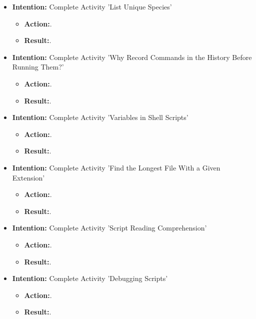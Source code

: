 \documentclass{article}
\begin{document}
\begin{itemize}

\item{\textbf{Intention:} Complete Activity 'List Unique Species'}

\begin{itemize}
\item{\textbf{Action:}.}

\item{\textbf{Result:}.}

\end{itemize}

\item{\textbf{Intention:} Complete Activity 'Why Record Commands in the History Before Running Them?'}

\begin{itemize}
\item{\textbf{Action:}.}

\item{\textbf{Result:}.}

\end{itemize}


\item{\textbf{Intention:} Complete Activity 'Variables in Shell Scripts'}

\begin{itemize}
\item{\textbf{Action:}.}

\item{\textbf{Result:}.}

\end{itemize}


\item{\textbf{Intention:} Complete Activity 'Find the Longest File With a Given Extension'}

\begin{itemize}
\item{\textbf{Action:}.}

\item{\textbf{Result:}.}

\end{itemize}

\item{\textbf{Intention:} Complete Activity 'Script Reading Comprehension'}

\begin{itemize}
\item{\textbf{Action:}.}

\item{\textbf{Result:}.}

\end{itemize}

\item{\textbf{Intention:} Complete Activity 'Debugging Scripts'}

\begin{itemize}
\item{\textbf{Action:}.}

\item{\textbf{Result:}.}

\end{itemize}


\end{itemize}
\end{document}
